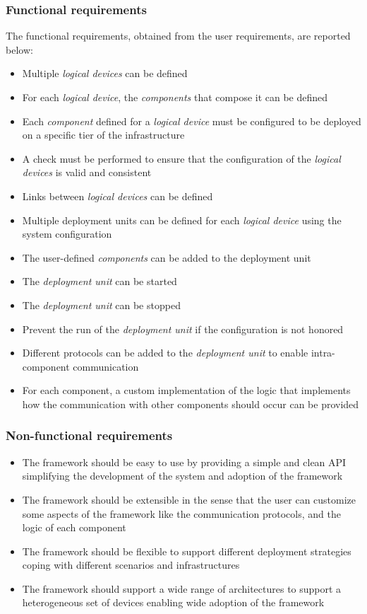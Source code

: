 \subsubsection{Functional requirements}
\label{sec:functional-requirements}

The functional requirements, obtained from the user requirements, are reported below:

\begin{itemize}
	\item Multiple \emph{logical devices} can be defined
	\item For each \emph{logical device}, the \emph{components} that compose it can be defined
	\item Each \emph{component} defined for a \emph{logical device} must be configured to be deployed on a specific tier of the infrastructure
	\item A check must be performed to ensure that the configuration of the \emph{logical devices} is valid and consistent
	\item Links between \emph{logical devices} can be defined
	\item Multiple deployment units can be defined for each \emph{logical device} using the system configuration
	\item The user-defined \emph{components} can be added to the deployment unit
	\item The \emph{deployment unit} can be started
	\item The \emph{deployment unit} can be stopped
	\item Prevent the run of the \emph{deployment unit} if the configuration is not honored
	\item Different protocols can be added to the \emph{deployment unit} to enable intra-component communication
	\item For each component, a custom implementation of the logic that implements how the communication with other components should occur can be
	      provided
\end{itemize}

\subsubsection{Non-functional requirements}
\label{sec:non-functional-requirements}

\begin{itemize}
	\item The framework should be easy to use by providing a simple and clean API simplifying the development of the system and adoption of the
	      framework
	\item The framework should be extensible in the sense that the user can customize some aspects of the framework like the communication protocols,
	      and the logic of each component
	\item The framework should be flexible to support different deployment strategies coping with different scenarios and infrastructures
	\item The framework should support a wide range of architectures to support a heterogeneous set of devices enabling wide adoption of the
	      framework
\end{itemize}

